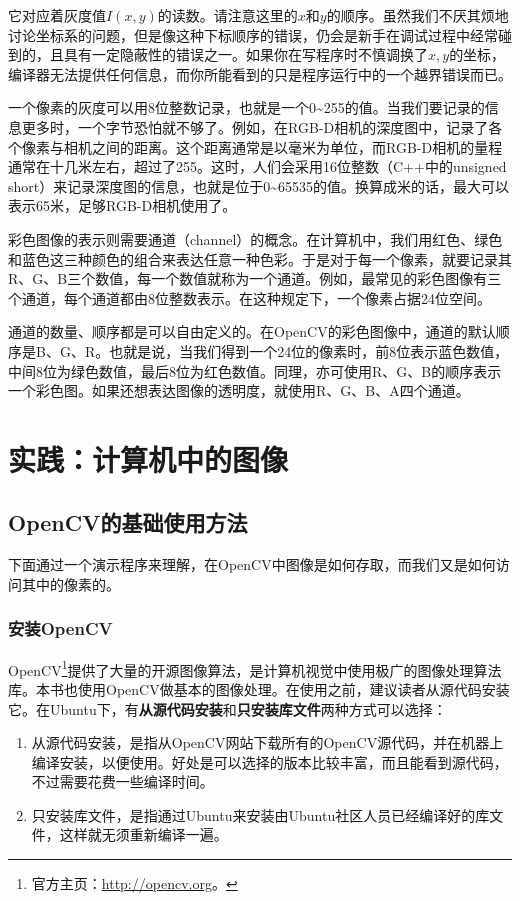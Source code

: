 它对应着灰度值$I(x,y)$的读数。请注意这里的$x$和$y$的顺序。虽然我们不厌其烦地讨论坐标系的问题，但是像这种下标顺序的错误，仍会是新手在调试过程中经常碰到的，且具有一定隐蔽性的错误之一。如果你在写程序时不慎调换了$x,y$的坐标，编译器无法提供任何信息，而你所能看到的只是程序运行中的一个越界错误而已。

一个像素的灰度可以用8位整数记录，也就是一个0\textasciitilde255的值。当我们要记录的信息更多时，一个字节恐怕就不够了。例如，在RGB-D相机的深度图中，记录了各个像素与相机之间的距离。这个距离通常是以毫米为单位，而RGB-D相机的量程通常在十几米左右，超过了255。这时，人们会采用16位整数（C++中的unsigned short）来记录深度图的信息，也就是位于0\textasciitilde65535的值。换算成米的话，最大可以表示65米，足够RGB-D相机使用了。

彩色图像的表示则需要通道（channel）的概念。在计算机中，我们用红色、绿色和蓝色这三种颜色的组合来表达任意一种色彩。于是对于每一个像素，就要记录其R、G、B三个数值，每一个数值就称为一个通道。例如，最常见的彩色图像有三个通道，每个通道都由8位整数表示。在这种规定下，一个像素占据24位空间。

通道的数量、顺序都是可以自由定义的。在OpenCV的彩色图像中，通道的默认顺序是B、G、R。也就是说，当我们得到一个24位的像素时，前8位表示蓝色数值，中间8位为绿色数值，最后8位为红色数值。同理，亦可使用R、G、B的顺序表示一个彩色图。如果还想表达图像的透明度，就使用R、G、B、A四个通道。

\section{实践：计算机中的图像}
\subsection{OpenCV的基础使用方法}
下面通过一个演示程序来理解，在OpenCV中图像是如何存取，而我们又是如何访问其中的像素的。

\subsubsection{安装OpenCV}
OpenCV\footnote{官方主页：\url{http://opencv.org}。}提供了大量的开源图像算法，是计算机视觉中使用极广的图像处理算法库。本书也使用OpenCV做基本的图像处理。在使用之前，建议读者从源代码安装它。在Ubuntu下，有\textbf{从源代码安装}和\textbf{只安装库文件}两种方式可以选择：

\begin{enumerate}
	\item 从源代码安装，是指从OpenCV网站下载所有的OpenCV源代码，并在机器上编译安装，以便使用。好处是可以选择的版本比较丰富，而且能看到源代码，不过需要花费一些编译时间。
	\item 只安装库文件，是指通过Ubuntu来安装由Ubuntu社区人员已经编译好的库文件，这样就无须重新编译一遍。
\end{enumerate}

